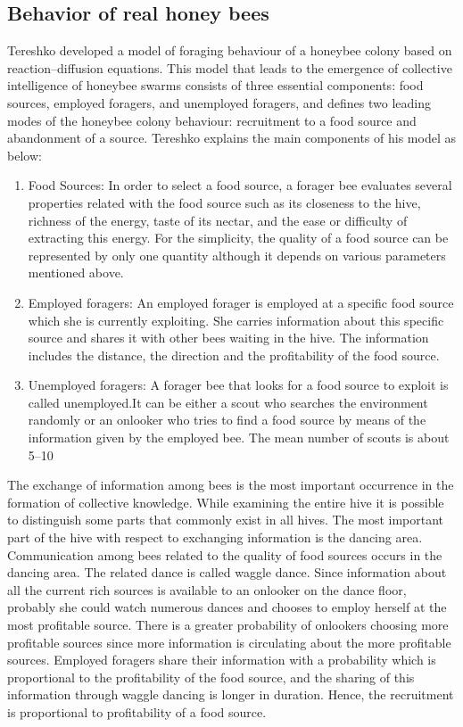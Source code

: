 \documentclass[pdftex,11pt]{article}
\begin{document}
\subsection{Behavior of real honey bees}
Tereshko developed a model of foraging behaviour of a honeybee colony based on reaction–diffusion equations. This model that leads to the emergence of collective intelligence of honeybee swarms consists of three essential components: food sources, employed foragers, and unemployed foragers, and defines two leading modes of the honeybee colony behaviour: recruitment to a food source and abandonment of a source. Tereshko explains the main components of his model as below:
\begin{enumerate}
\item Food Sources: In order to select a food source, a forager bee evaluates several properties related with the food source such as its closeness to the hive, richness of the energy, taste of its nectar, and the ease or difficulty of extracting this energy. For the simplicity, the quality of a food source can be represented by only one quantity although it depends on various parameters mentioned above.
\item Employed foragers: An employed forager is employed at a specific food source which she is currently exploiting. She carries information about this specific source and shares it with other bees waiting in the hive. The information includes the distance, the direction and the profitability of the food source.
\item Unemployed foragers: A forager bee that looks for a food source to exploit is called unemployed.It can be either a scout who searches the environment randomly or an onlooker who tries to find a food source by means of the information given by the employed bee. The mean number of scouts is about 5–10%
\end{enumerate}
The exchange of information among bees is the most important occurrence in the formation of collective knowledge. While examining the entire hive it is possible to distinguish some parts that commonly exist in all hives. The most important part of the hive with respect to exchanging information is the dancing area. Communication among bees related to the quality of food sources occurs in the dancing area. The related dance is called waggle dance. Since information about all the current rich sources is available to an onlooker on the dance floor, probably she could watch numerous dances and chooses to employ herself at the most profitable source. There is a greater probability of onlookers choosing more profitable sources since more information is circulating about the more profitable sources. Employed foragers share their information with a probability which is proportional to the profitability of the food source, and the sharing of this information through waggle dancing is longer in duration. Hence, the recruitment is proportional to profitability of a food source.
\end{document}
